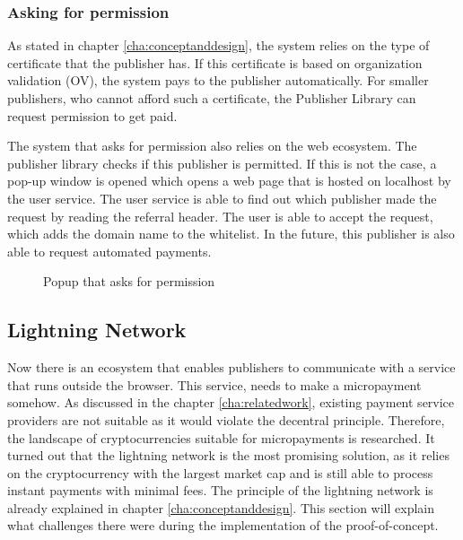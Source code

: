 \subsubsection{Asking for permission}
As stated in chapter \ref{cha:conceptanddesign}, the system relies on the type of certificate that the publisher has. If this certificate is based on organization validation (OV), the system pays to the publisher automatically. For smaller publishers, who cannot afford such a certificate, the Publisher Library can request permission to get paid. 

The system that asks for permission also relies on the web ecosystem. The publisher library checks if this publisher is permitted. If this is not the case, a pop-up window is opened which opens a web page that is hosted on localhost by the user service. The user service is able to find out which publisher made the request by reading the referral header. The user is able to accept the request, which adds the domain name to the whitelist. In the future, this publisher is also able to request automated payments.

\begin{figure}[h!]
  \setlength{\fboxsep}{0pt}%
  \caption{Popup that asks for permission}
\end{figure}

\subsection{Lightning Network}
\label{sec:lightningnetwork}

Now there is an ecosystem that enables publishers to communicate with a service that runs outside the browser. This service, needs to make a micropayment somehow. As discussed in the chapter \ref{cha:relatedwork}, existing payment service providers are not suitable as it would violate the decentral principle. Therefore, the landscape of cryptocurrencies suitable for micropayments is researched. It turned out that the lightning network is the most promising solution, as it relies on the cryptocurrency with the largest market cap and is still able to process instant payments with minimal fees. The principle of the lightning network is already explained in chapter \ref{cha:conceptanddesign}. This section will explain what challenges there were during the implementation of the proof-of-concept.

